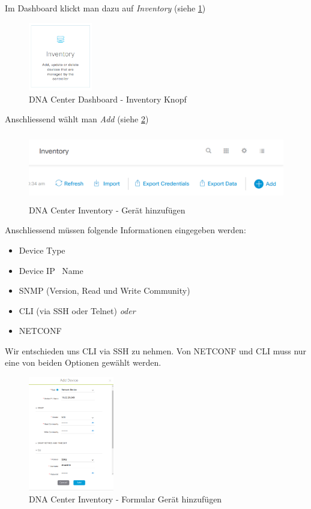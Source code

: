 Im Dashboard klickt man dazu auf \textit{Inventory} (siehe \ref{fig:dna-center-inventory-button})

\begin{figure}[H]
	\centering
	\includegraphics[height=3cm]{img/dna-center-inventory-button.PNG}
	\caption{DNA Center Dashboard - Inventory Knopf}
	\label{fig:dna-center-inventory-button}
\end{figure}

Anschliessend wählt man \textit{Add} (siehe \ref{fig:dna-center-inventory-add})

\begin{figure}[H]
	\centering
	\includegraphics[height=3cm]{img/dna-center-inventory-add.PNG}
	\caption{DNA Center Inventory - Gerät hinzufügen}
	\label{fig:dna-center-inventory-add}
\end{figure}

Anschliessend müssen folgende Informationen eingegeben werden:
\begin{itemize}
	\item Device Type
	\item Device IP \ Name
	\item SNMP (Version, Read und Write Community)
	\item CLI (via SSH oder Telnet) \textit{oder}
	\item NETCONF
\end{itemize}

Wir entschieden uns CLI via SSH zu nehmen. Von NETCONF und CLI muss nur eine von beiden Optionen gewählt werden. 

\begin{figure}[H]
	\centering
	\includegraphics[height=5cm]{img/dna-center-inventory-add-form.png}
	\caption{DNA Center Inventory - Formular Gerät hinzufügen}
	\label{fig:dna-center-inventory-add-form}
\end{figure}

